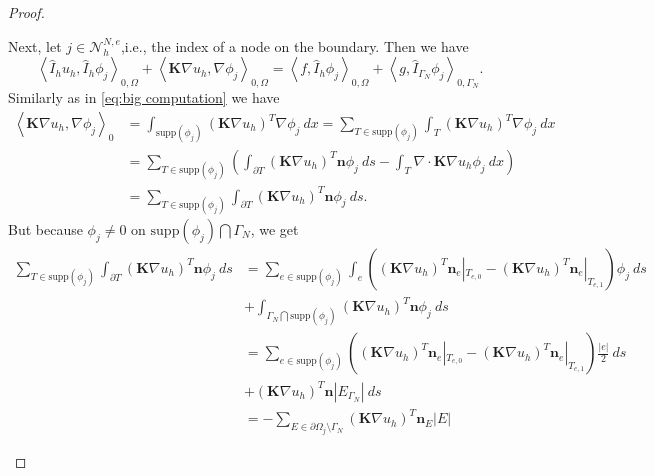 \documentclass[../Main/main.tex]{subfiles}
\begin{document}
\begin{proof}
\begin{enumerate}
\begin{equation}
			\end{equation}
			Next, let $j \in \mathcal{N}_h^{N,e}$,i.e., the index of a node on the boundary. Then we have 
			\begin{equation}\label{eq:case neumann node}
				\left \langle \hat{I}_h u_h,\hat{I}_h \phi_j \right \rangle_{0,\Omega} +   \left \langle\bm{K} \nabla u_h,\nabla \phi_j \right \rangle_{0,\Omega} = \left \langle f,\hat{I}_h \phi_j \right \rangle_{0,\Omega}+ \left \langle g,\hat{I}_{\Gamma_N} \phi_j \right \rangle_{0,\Gamma_N}.
			\end{equation}
			Similarly as in \eqref{eq:big computation} we have
			\begin{equation}\label{eq:case neumann 1}
				\begin{aligned}
						\left \langle\bm{K}\nabla u_h, \nabla \phi_{j} \right \rangle_0 &= \int_{\text{supp}(\phi_{j})} (\bm{K} \nabla u_h)^T\nabla \phi_{j} \ dx = \sum_{T\in \text{supp}(\phi_{j})} \int_T (\bm{K}\nabla u_h)^T\nabla \phi_{j} \ dx \\
					&= \sum_{T\in \text{supp}(\phi_{j})} \left ( \int_{\partial T} (\bm{K}\nabla u_h)^T\bm{n}\phi_{j} \ ds-\int_T \nabla \cdot\bm{K} \nabla u_h \phi_{j} \ dx \right ) \\
					&=\sum_{T\in \text{supp}(\phi_{j})}\int_{\partial T} (\bm{K}\nabla u_h)^T\bm{n}\phi_{j} \ ds.
				\end{aligned}
			\end{equation}
			But because $\phi_{j}\neq 0$ on $\text{supp}(\phi_{j})\bigcap \Gamma_N$, we get
			\begin{equation}\label{eq:case neumann 2}
				\begin{aligned}
					\sum_{T\in \text{supp}(\phi_{j})}\int_{\partial T} (\bm{K}\nabla u_h)^T\bm{n}\phi_{j} \ ds &= \sum_{e\in \text{supp}(\phi_{j})} \int_e \left((\bm{K}\nabla u_h)^T\bm{n}_e|_{T_{e,0}} - (\bm{K}\nabla u_h)^T\bm{n}_e|_{T_{e,1}}\right)\phi_j \ ds\\ &+ \int_{\Gamma_N \bigcap \text{supp}(\phi_{j})}(\bm{K}\nabla u_h)^T\bm{n} \phi_j \ ds\\
					&= \sum_{e\in \text{supp}(\phi_{j})} \left ((\bm{K}\nabla u_h)^T\bm{n}_e|_{T_{e,0}} - (\bm{K}\nabla u_h)^T\bm{n}_e|_{T_{e,1}}\right)\frac{|e|}{2} \ ds\\ &+ (\bm{K}\nabla u_h)^T\bm{n} |E_{\Gamma_N}| \ ds\\
					&= -\sum_{E\in \partial \Omega_{j}\setminus \Gamma_N} (\bm{K}\nabla u_h)^T\bm{n}_E |E|
				\end{aligned}
			\end{equation}

\end{enumerate}
\end{proof}
\end{document}
